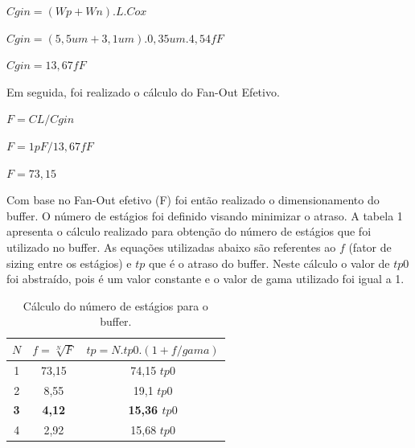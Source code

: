 \documentclass[a4paper,10pt] {article}
\begin{document}
\begin{math} Cgin=(Wp+Wn).L.Cox\end{math}

\begin{math} Cgin=(5,5um+3,1um).0,35um.4,54fF\end{math}

\begin{math} Cgin=13,67fF\end{math}

Em seguida, foi realizado o cálculo do Fan-Out Efetivo.

\begin{math} F=CL/Cgin\end{math}

\begin{math} F=1pF/13,67fF\end{math}

\begin{math} F=73,15\end{math}

Com base no Fan-Out efetivo (F) foi então realizado o dimensionamento do buffer. O número de estágios foi definido visando minimizar o atraso. A tabela 1 apresenta o cálculo realizado para obtenção do número de estágios que foi utilizado no buffer. As equações utilizadas abaixo são referentes ao \begin{math} f \end{math} (fator de sizing entre os estágios) e \begin{math} tp \end{math} que é o atraso do buffer. Neste cálculo o valor de \begin{math} tp0 \end{math} foi abstraído, pois é um valor constante e o valor de gama utilizado foi igual a 1.

\begin{table}[h]
	\label{tab:table1}
	\centering
	\begin{tabular}{c|c|c}
		\hline
		\begin{math} N \end{math} & \begin{math} f=\sqrt[N]{F} \end{math} & \begin{math} tp=N.tp0.(1+f/gama) \end{math}\\
		\hline
		1 & 73,15 & 74,15 \begin{math} tp0 \end{math} \\
		2 & 8,55  & 19,1 \begin{math} tp0 \end{math} \\
		\textbf{3} & \textbf{4,12}  & \textbf {15,36 \begin{math} tp0 \end{math}} \\
		4 & 2,92  & 15,68 \begin{math} tp0 \end{math} \\
 		\hline
	\end{tabular}
	\caption{Cálculo do número de estágios para o buffer.}
\end{table}
\end{document}
